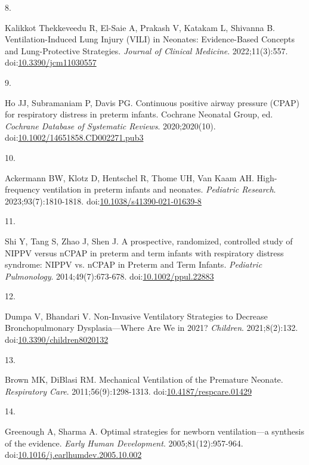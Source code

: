 \documentclass[
  letterpaper,
  DIV=11,
  numbers=noendperiod]{scrartcl}
\newlength{\cslhangindent}
\newlength{\csllabelwidth}
\newenvironment{CSLReferences}[2] %
 {\begin{list}{}{%
  \setlength{\itemindent}{0pt}
  \setlength{\leftmargin}{0pt}
  \setlength{\parsep}{0pt}
  \ifodd #1
   \setlength{\leftmargin}{\cslhangindent}
   \setlength{\itemindent}{-1\cslhangindent}
  \fi
  \setlength{\itemsep}{#2\baselineskip}}}
 {\end{list}}
\newcommand{\CSLLeftMargin}[1]{\parbox[t]{\csllabelwidth}{\strut#1\strut}}
\newcommand{\CSLRightInline}[1]{\parbox[t]{\linewidth - \csllabelwidth}{\strut#1\strut}}
\begin{document}
\begin{CSLReferences}{0}{1}
\CSLLeftMargin{8. }%
\CSLRightInline{Kalikkot Thekkeveedu R, El-Saie A, Prakash V, Katakam L,
Shivanna B. Ventilation-{Induced Lung Injury} ({VILI}) in {Neonates}:
{Evidence-Based Concepts} and {Lung-Protective Strategies}.
\emph{Journal of Clinical Medicine}. 2022;11(3):557.
doi:\href{https://doi.org/10.3390/jcm11030557}{10.3390/jcm11030557}}

\CSLLeftMargin{9. }%
\CSLRightInline{Ho JJ, Subramaniam P, Davis PG. Continuous positive
airway pressure ({CPAP}) for respiratory distress in preterm infants.
Cochrane Neonatal Group, ed. \emph{Cochrane Database of Systematic
Reviews}. 2020;2020(10).
doi:\href{https://doi.org/10.1002/14651858.CD002271.pub3}{10.1002/14651858.CD002271.pub3}}

\CSLLeftMargin{10. }%
\CSLRightInline{Ackermann BW, Klotz D, Hentschel R, Thome UH, Van Kaam
AH. High-frequency ventilation in preterm infants and neonates.
\emph{Pediatric Research}. 2023;93(7):1810-1818.
doi:\href{https://doi.org/10.1038/s41390-021-01639-8}{10.1038/s41390-021-01639-8}}

\CSLLeftMargin{11. }%
\CSLRightInline{Shi Y, Tang S, Zhao J, Shen J. A prospective,
randomized, controlled study of {NIPPV} versus {nCPAP} in preterm and
term infants with respiratory distress syndrome: {NIPPV} vs. {nCPAP} in
{Preterm} and {Term Infants}. \emph{Pediatric Pulmonology}.
2014;49(7):673-678.
doi:\href{https://doi.org/10.1002/ppul.22883}{10.1002/ppul.22883}}

\CSLLeftMargin{12. }%
\CSLRightInline{Dumpa V, Bhandari V. Non-{Invasive Ventilatory
Strategies} to {Decrease Bronchopulmonary Dysplasia}---{Where Are We} in
2021? \emph{Children}. 2021;8(2):132.
doi:\href{https://doi.org/10.3390/children8020132}{10.3390/children8020132}}

\CSLLeftMargin{13. }%
\CSLRightInline{Brown MK, DiBlasi RM. Mechanical {Ventilation} of the
{Premature Neonate}. \emph{Respiratory Care}. 2011;56(9):1298-1313.
doi:\href{https://doi.org/10.4187/respcare.01429}{10.4187/respcare.01429}}

\CSLLeftMargin{14. }%
\CSLRightInline{Greenough A, Sharma A. Optimal strategies for newborn
ventilation---a synthesis of the evidence. \emph{Early Human
Development}. 2005;81(12):957-964.
doi:\href{https://doi.org/10.1016/j.earlhumdev.2005.10.002}{10.1016/j.earlhumdev.2005.10.002}}


\end{CSLReferences}
\end{document}
